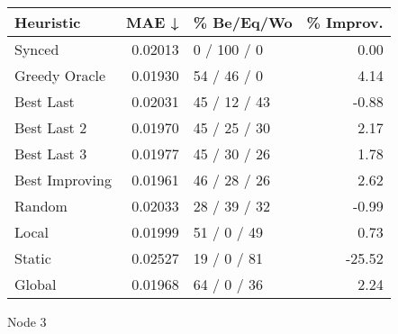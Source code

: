 \begin{tabular}{lrlr}
\toprule
\textbf{Heuristic} & \textbf{MAE ↓} & \textbf{\% Be/Eq/Wo} & \textbf{\% Improv.} \\
\midrule
            Synced &        0.02013 &          0 / 100 / 0 &                0.00 \\
     Greedy Oracle &        0.01930 &          54 / 46 / 0 &                4.14 \\
         Best Last &        0.02031 &         45 / 12 / 43 &               -0.88 \\
       Best Last 2 &        0.01970 &         45 / 25 / 30 &                2.17 \\
       Best Last 3 &        0.01977 &         45 / 30 / 26 &                1.78 \\
    Best Improving &        0.01961 &         46 / 28 / 26 &                2.62 \\
            Random &        0.02033 &         28 / 39 / 32 &               -0.99 \\
             Local &        0.01999 &          51 / 0 / 49 &                0.73 \\
            Static &        0.02527 &          19 / 0 / 81 &              -25.52 \\
            Global &        0.01968 &          64 / 0 / 36 &                2.24 \\
\bottomrule
\end{tabular}
\caption{Node 3}
\label{tab:iid_lr01_le2_bs2_3}
